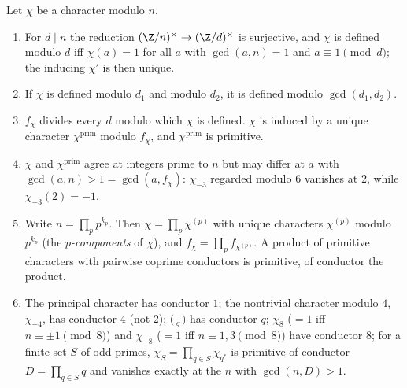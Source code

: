 \begin{proposition}\label{prop:rings:conductor}
Let $\chi$ be a character modulo $n$.
\begin{enumerate}[label=(\roman*)]
\item For $d\mid n$ the reduction $(\Z/n)^\times\to(\Z/d)^\times$ is surjective, and $\chi$ is defined modulo $d$ iff $\chi(a)=1$ for all $a$ with $\gcd(a,n)=1$ and
$a\equiv1\pmod d$; the inducing $\chi'$ is then unique.
\item If $\chi$ is defined modulo $d_1$ and modulo $d_2$, it is defined modulo $\gcd(d_1,d_2)$.
\item $f_\chi$ divides every $d$ modulo which $\chi$ is defined. $\chi$ is induced by a unique character $\chi^{\mathrm{prim}}$ modulo $f_\chi$, and $\chi^{\mathrm{prim}}$ is primitive.
\item $\chi$ and $\chi^{\mathrm{prim}}$ agree at integers prime to $n$ but may differ at $a$ with $\gcd(a,n)>1=\gcd(a,f_\chi)$: $\chi_{-3}$ regarded modulo $6$ vanishes at $2$,
while $\chi_{-3}(2)=-1$.
\item Write $n=\prod_pp^{k_p}$. Then $\chi=\prod_p\chi^{(p)}$ with unique characters $\chi^{(p)}$ modulo $p^{k_p}$ (the \emph{$p$-components} of $\chi$), and
$f_\chi=\prod_pf_{\chi^{(p)}}$. A product of primitive
characters with pairwise coprime conductors is primitive, of conductor the product.
\item The principal character has conductor $1$; the nontrivial character modulo $4$, $\chi_{-4}$, has conductor $4$ (not $2$); $\bigl(\frac\cdot q\bigr)$ has conductor
$q$; $\chi_8$ ($=1$ iff $n\equiv\pm1\pmod8$) and $\chi_{-8}$ ($=1$ iff $n\equiv1,3\pmod8$) have conductor $8$; for a finite set $S$ of odd primes,
$\chi_S=\prod_{q\in S}\chi_{q^*}$ is primitive of conductor $D=\prod_{q\in S}q$ and vanishes exactly at the $n$ with $\gcd(n,D)>1$.
\end{enumerate}
\end{proposition}

